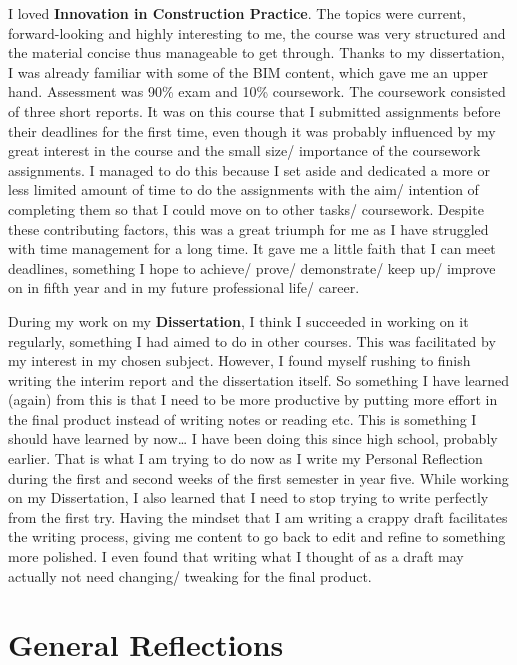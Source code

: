 I loved \textbf{Innovation in Construction Practice}.
The topics were current, forward-looking and highly interesting to me, the course was very structured and the material concise thus manageable to get through.
Thanks to my dissertation, I was already familiar with some of the BIM content, which gave me an upper hand.
Assessment was 90\% exam and 10\% coursework.
The coursework consisted of three short reports.
It was on this course that I submitted assignments before their deadlines for the first time, even though it was probably influenced by my great interest in the course and the small size/ importance of the coursework assignments.
I managed to do this because I set aside and dedicated a more or less limited amount of time to do the assignments with the aim/ intention of completing them so that I could move on to other tasks/ coursework.
Despite these contributing factors, this was a great triumph for me as I have struggled with time management for a long time.
It gave me a little faith that I can meet deadlines, something I hope to achieve/ prove/ demonstrate/ keep up/ improve on in fifth year and in my future professional life/ career.

During my work on my \textbf{Dissertation}, I think I succeeded in working on it regularly, something I had aimed to do in other courses.
This was facilitated by my interest in my chosen subject.
However, I found myself rushing to finish writing the interim report and the dissertation itself.
So something I have learned (again) from this is that I need to be more productive by putting more effort in the final product instead of writing notes or reading etc.
This is something I should have learned by now…
I have been doing this since high school, probably earlier.
That is what I am trying to do now as I write my Personal Reflection during the first and second weeks of the first semester in year five.
While working on my Dissertation, I also learned that I need to stop trying to write perfectly from the first try.
Having the mindset that I am writing a crappy draft facilitates the writing process, giving me content to go back to edit and refine to something more polished.
I even found that writing what I thought of as a draft may actually not need changing/ tweaking for the final product.



\section{General Reflections}

